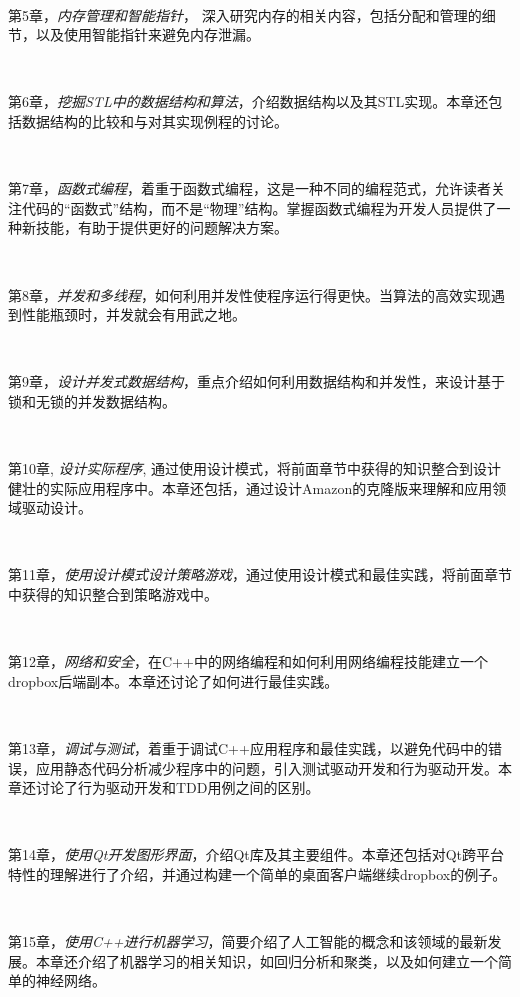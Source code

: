 \noindent\textbf{}\ \par
\textsf{第5章}，\textit{内存管理和智能指针}， 深入研究内存的相关内容，包括分配和管理的细节，以及使用智能指针来避免内存泄漏。

\noindent\textbf{}\ \par
\textsf{第6章}，\textit{挖掘STL中的数据结构和算法}，介绍数据结构以及其STL实现。本章还包括数据结构的比较和与对其实现例程的讨论。

\noindent\textbf{}\ \par
\textsf{第7章}，\textit{函数式编程}，着重于函数式编程，这是一种不同的编程范式，允许读者关注代码的“函数式”结构，而不是“物理”结构。掌握函数式编程为开发人员提供了一种新技能，有助于提供更好的问题解决方案。

\noindent\textbf{}\ \par
\textsf{第8章}，\textit{并发和多线程}，如何利用并发性使程序运行得更快。当算法的高效实现遇到性能瓶颈时，并发就会有用武之地。

\noindent\textbf{}\ \par
\textsf{第9章}，\textit{设计并发式数据结构}，重点介绍如何利用数据结构和并发性，来设计基于锁和无锁的并发数据结构。

\noindent\textbf{}\ \par
\textsf{第10章}, \textit{设计实际程序}, 通过使用设计模式，将前面章节中获得的知识整合到设计健壮的实际应用程序中。本章还包括，通过设计Amazon的克隆版来理解和应用领域驱动设计。

\noindent\textbf{}\ \par
\textsf{第11章}，\textit{使用设计模式设计策略游戏}，通过使用设计模式和最佳实践，将前面章节中获得的知识整合到策略游戏中。

\noindent\textbf{}\ \par
\textsf{第12章}，\textit{网络和安全}，在C++中的网络编程和如何利用网络编程技能建立一个dropbox后端副本。本章还讨论了如何进行最佳实践。

\noindent\textbf{}\ \par
\textsf{第13章}，\textit{调试与测试}，着重于调试C++应用程序和最佳实践，以避免代码中的错误，应用静态代码分析减少程序中的问题，引入测试驱动开发和行为驱动开发。本章还讨论了行为驱动开发和TDD用例之间的区别。

\noindent\textbf{}\ \par
\textsf{第14章}，\textit{使用Qt开发图形界面}，介绍Qt库及其主要组件。本章还包括对Qt跨平台特性的理解进行了介绍，并通过构建一个简单的桌面客户端继续dropbox的例子。

\noindent\textbf{}\ \par
\textsf{第15章}，\textit{使用C++进行机器学习}，简要介绍了人工智能的概念和该领域的最新发展。本章还介绍了机器学习的相关知识，如回归分析和聚类，以及如何建立一个简单的神经网络。

